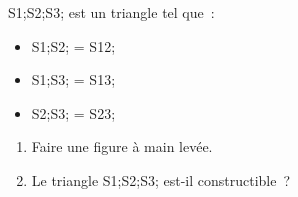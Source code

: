 \documentclass[exercice]{thedocument}%
\begin{document}
%
\<S1;\<S2;\<S3; est un triangle tel que~:
\begin{itemize}
    \item \<S1;\<S2; = \<S12;
    \item \<S1;\<S3; = \<S13;
    \item \<S2;\<S3; = \<S23;
\end{itemize}
\begin{enumerate}
    \item Faire une figure à main levée.
    \item Le triangle \<S1;\<S2;\<S3; est-il constructible~?
\end{enumerate}
\end{document}
